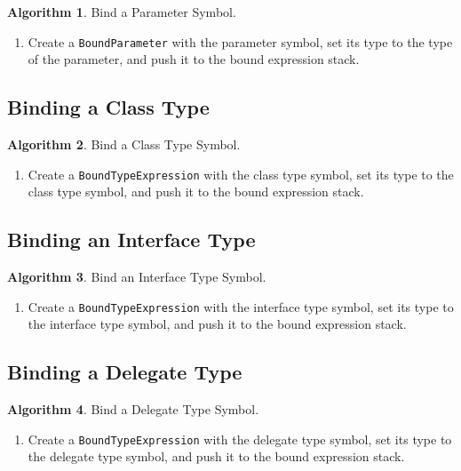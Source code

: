 \documentclass[a4paper,oneside,11pt]{book}
\theoremstyle{definition}
\newtheorem{algo}{Algorithm}[section]
\begin{document}
\begin{algo}\label{bindparametersymbol} Bind a Parameter Symbol.
\begin{enumerate}
\item
Create a \verb|BoundParameter| with the parameter symbol, set its type to the type of the parameter, and push it to the bound expression stack.
\end{enumerate}
\end{algo}

\subsection{Binding a Class Type}

\begin{algo}\label{bindclasstypesymbol} Bind a Class Type Symbol.
\begin{enumerate}
\item
Create a \verb|BoundTypeExpression| with the class type symbol, set its type to the class type symbol, and push it to the bound expression stack.
\end{enumerate}
\end{algo}

\subsection{Binding an Interface Type}

\begin{algo}\label{bindinterfacetypesymbol} Bind an Interface Type Symbol.
\begin{enumerate}
\item
Create a \verb|BoundTypeExpression| with the interface type symbol, set its type to the interface type symbol, and push it to the bound expression stack.
\end{enumerate}
\end{algo}

\subsection{Binding a Delegate Type}

\begin{algo}\label{binddelegatetypesymbol} Bind a Delegate Type Symbol.
\begin{enumerate}
\item
Create a \verb|BoundTypeExpression| with the delegate type symbol, set its type to the delegate type symbol, and push it to the bound expression stack.
\end{enumerate}
\end{algo}
\end{document}
